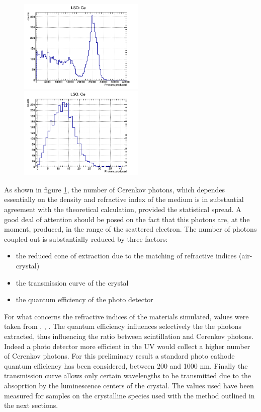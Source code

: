 \begin{figure}[htbp]
\begin{center}
\includegraphics[width=6cm]{../Pictures/Chapter_5/spctrum_LSO.png}
\includegraphics[width=6cm]{../Pictures/Chapter_5/cerenkov_LSO.png}
\end{center}
\caption[]{}
\label{fig:ceren_phot}
\end{figure}
As shown in figure \ref{fig:ceren_phot}, the number of Cerenkov photons, which dependes essentially on the density and refractive index of the medium is in substantial agreement with the theoretical calculation, provided the statistical spread.
A good deal of attention should be posed on the fact that this photons are, at the moment, produced, in the range of the scattered electron. 
The number of photons coupled out is substantially reduced by three factors: 
\begin{itemize}
\item the reduced cone of extraction due to the matching of refractive indices (air-crystal)
\item the transmission curve of the crystal
\item the quantum efficiency of the photo detector
\end{itemize}
For what concerns the refractive indices of the materials simulated, values were taken from \cite{Auffray2009}, \cite{Kuwano2004}, \cite{jellison2012}.
The quantum efficiency influences selectively the the photons extracted, thus influencing the ratio between scintillation and Cerenkov photons. Indeed a photo detector more efficient in the UV would collect a higher number of Cerenkov photons. For this preliminary result a standard photo cathode quantum efficiency has been considered, between 200 and 1000 nm.
Finally the transmission curve allows only certain wavelengths to be transmitted due to the absoprtion by the luminescence centers of the crystal. The values used have been measured for samples on the crystalline species used with the method outlined in the next sections.

